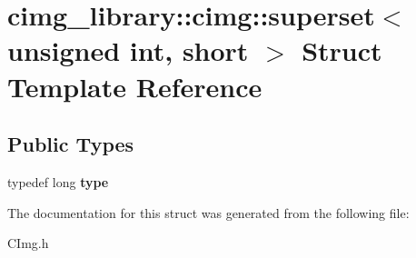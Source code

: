 \hypertarget{structcimg__library_1_1cimg_1_1superset_3_01unsigned_01int_00_01short_01_4}{\section{cimg\-\_\-library\-:\-:cimg\-:\-:superset$<$ unsigned int, short $>$ Struct Template Reference}
\label{structcimg__library_1_1cimg_1_1superset_3_01unsigned_01int_00_01short_01_4}
}
\subsection*{Public Types}
\begin{DoxyCompactItemize}
\item 
\hypertarget{structcimg__library_1_1cimg_1_1superset_3_01unsigned_01int_00_01short_01_4_aad68538618a333bcbf4ddecc1f183199}{typedef long {\bfseries type}}\label{structcimg__library_1_1cimg_1_1superset_3_01unsigned_01int_00_01short_01_4_aad68538618a333bcbf4ddecc1f183199}

\end{DoxyCompactItemize}


The documentation for this struct was generated from the following file\-:\begin{DoxyCompactItemize}
\item 
C\-Img.\-h\end{DoxyCompactItemize}
